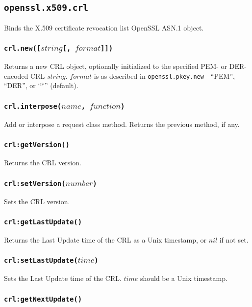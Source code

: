 \documentclass[11pt, oneside]{memoir}
\newcommand*{\fn}[1]{\texttt{#1}\xspace}
\newcounter{toccols}
\newenvironment{Module}[1]{
	\subsection{\texttt{#1}}
	\addtocontents{toc}{
		\protect\begin{multicols}{\value{toccols}}
	}
}{
	\addtocontents{toc}{\protect\end{multicols}}
}
\begin{document}
\begin{Module}{openssl.x509.crl}

Binds the X.509 certificate revocation list OpenSSL ASN.1 object.

\subsubsection[\fn{crl.new}]{\fn{crl.new([$string$[, $format$]])}}

Returns a new CRL object, optionally initialized to the specified PEM- or DER-encoded CRL $string$. $format$ is as described in \fn{openssl.pkey.new}---``PEM'', ``DER'', or ``*'' (default).

\subsubsection[\fn{crl.interpose}]{\fn{crl.interpose($name$, $function$)}}

Add or interpose a request class method. Returns the previous method, if any.

\subsubsection[\fn{crl:getVersion}]{\fn{crl:getVersion()}}

Returns the CRL version.

\subsubsection[\fn{crl:setVersion}]{\fn{crl:setVersion($number$)}}

Sets the CRL version.

\subsubsection[\fn{crl:getLastUpdate}]{\fn{crl:getLastUpdate()}}

Returns the Last Update time of the CRL as a Unix timestamp, or $nil$ if not set.

\subsubsection[\fn{crl:setLastUpdate}]{\fn{crl:setLastUpdate($time$)}}

Sets the Last Update time of the CRL. $time$ should be a Unix timestamp.

\subsubsection[\fn{crl:getNextUpdate}]{\fn{crl:getNextUpdate()}}


\end{Module}
\end{document}
